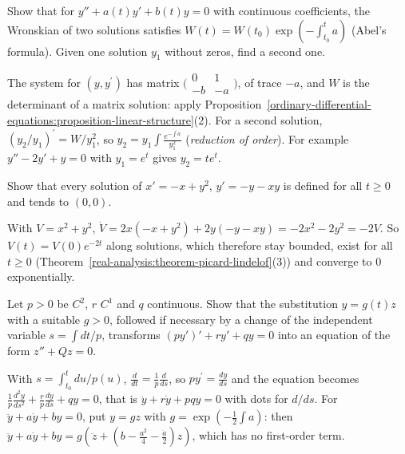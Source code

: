 \begin{exercise}\label{ordinary-differential-equations:exercise-abel}
Show that for $y'' + a(t)y' + b(t)y = 0$ with continuous coefficients, the Wronskian of two solutions satisfies $W(t) = W(t_0)\exp(-\int_{t_0}^ta)$ (Abel's formula). Given one solution $y_1$ without zeros, find a second one.
\end{exercise}

\begin{solution}
The system for $(y, y^{\prime})$ has matrix $\bigl(\begin{smallmatrix}0 & 1\\ -b & -a\end{smallmatrix}\bigr)$, of trace $-a$, and $W$ is the determinant of a matrix solution: apply Proposition~\ref{ordinary-differential-equations:proposition-linear-structure}(2).
For a second solution, $(y_2/y_1)^{\prime} = W/y_1^2$, so $y_2 = y_1\int\frac{e^{-\int a}}{y_1^2}$ (\emph{reduction of order}). For example $y'' - 2y' + y = 0$ with $y_1 = e^t$ gives $y_2 = te^t$.
\end{solution}

\begin{exercise}\label{ordinary-differential-equations:exercise-lyapunov-quadratic}
Show that every solution of $x' = -x + y^2$, $y' = -y - xy$ is defined for all $t \geq 0$ and tends to $(0, 0)$.
\end{exercise}

\begin{solution}
With $V = x^2 + y^2$, $\dot V = 2x(-x + y^2) + 2y(-y - xy) = -2x^2 - 2y^2 = -2V$. So $V(t) = V(0)e^{-2t}$ along solutions, which therefore stay bounded, exist for all $t \geq 0$ (Theorem~\ref{real-analysis:theorem-picard-lindelof}(3)) and converge
to $0$ exponentially.
\end{solution}

\begin{exercise}\label{ordinary-differential-equations:exercise-liouville-normal-form}
Let $p > 0$ be $C^2$, $r$ $C^1$ and $q$ continuous. Show that the substitution $y = g(t)z$ with a suitable $g > 0$, followed if necessary by a change of the independent variable $s = \int dt/p$, transforms $(py')' + ry' + qy = 0$ into an equation of the
form $z'' + Q z = 0$.
\end{exercise}

\begin{solution}
With $s = \int_{t_0}^tdu/p(u)$, $\frac{d}{dt} = \frac1p\frac{d}{ds}$, so $py^{\prime} = \frac{dy}{ds}$ and the equation becomes $\frac{1}{p}\frac{d^2y}{ds^2} + \frac{r}{p}\frac{dy}{ds} + qy = 0$, that is $\ddot y + r\dot y + pqy = 0$ with dots for $d/ds$. For
$\ddot y + a\dot y + by = 0$, put $y = gz$ with $g = \exp(-\frac12\int a)$: then $\ddot y + a\dot y + by = g(\ddot z + (b - \frac{a^2}{4} - \frac{\dot a}{2})z)$, which has no first-order term.
\end{solution}

